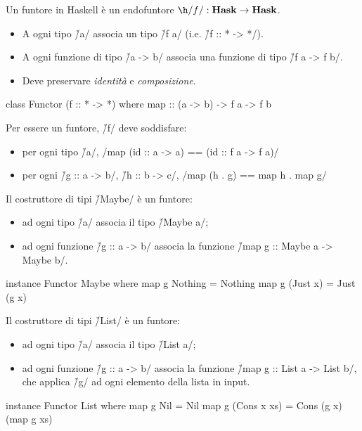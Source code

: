 \begin{frame}[fragile]
Un funtore in Haskell è un endofuntore $\h/f/:\Hask\to\Hask$.

\begin{itemize}
\item A ogni tipo \h/a/ associa un tipo \h/f a/ (i.e. \h/f :: * -> */).
\item A ogni funzione di tipo \h/a -> b/ associa una funzione di tipo \h/f a -> f b/.
\item Deve preservare \emph{identità} e \emph{composizione}.
\end{itemize}
\end{frame}

\begin{frame}[fragile]
\begin{haskellcode}
class Functor (f :: * -> *) where
    map :: (a -> b) -> f a -> f b
\end{haskellcode}

Per essere un funtore, \h/f/ deve soddisfare:
\begin{itemize}
\item per ogni tipo \h/a/,
\haskell/map (id :: a -> a) == (id :: f a -> f a)/
\item per ogni \h/g :: a -> b/, \h/h :: b -> c/,
\haskell/map (h . g) == map h . map g/
\end{itemize}
\end{frame}


\begin{frame}[fragile]
Il costruttore di tipi \h/Maybe/ è un funtore:
\begin{itemize}
\item ad ogni tipo \h/a/ associa il tipo \h/Maybe a/;
\item ad ogni funzione \h/g :: a -> b/ associa la funzione \h/map g :: Maybe a -> Maybe b/.
\end{itemize}

\begin{haskellcode}
instance Functor Maybe where
    map g Nothing = Nothing
    map g (Just x) = Just (g x)
\end{haskellcode}
\end{frame}

\begin{frame}[fragile]
Il costruttore di tipi \h/List/ è un funtore:
\begin{itemize}
\item ad ogni tipo \h/a/ associa il tipo \h/List a/;
\item ad ogni funzione \h/g :: a -> b/ associa la funzione \h/map g :: List a -> List b/, che applica \h/g/ ad ogni elemento della lista in input.
\end{itemize}

\begin{haskellcode}
instance Functor List where
    map g Nil = Nil
    map g (Cons x xs) = Cons (g x) (map g xs)
\end{haskellcode}
\end{frame}


